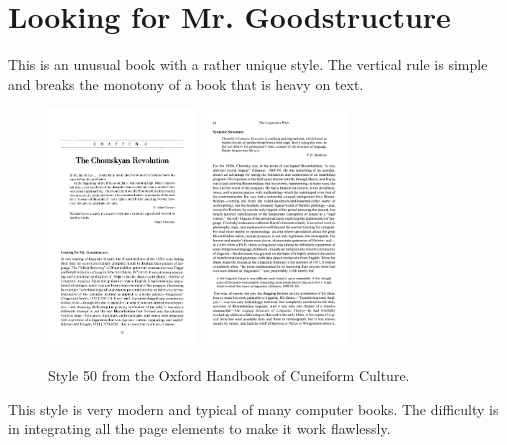 \section{Looking for Mr. Goodstructure}
This is an unusual book with a rather unique style. The vertical rule is simple and breaks the monotony of a book that is heavy on text.
\begin{figure}[ht]
\centering
\includegraphics[width=0.35\textwidth]{./chapters/chapter52}
\includegraphics[width=0.35\textwidth]{./chapters/chapter52a}
\caption{Style 50 from the Oxford Handbook of Cuneiform Culture.}
\end{figure}

This style is very modern and typical of many computer books. The difficulty is in integrating all the page elements to make it work flawlessly.

